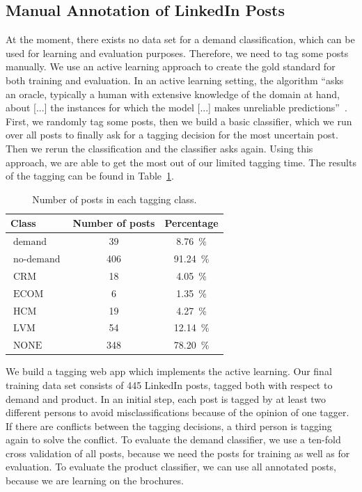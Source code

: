 \subsection{Manual Annotation of LinkedIn Posts}

At the moment, there exists no data set for a demand classification, which can be used for learning and evaluation purposes.
Therefore, we need to tag some posts manually.
We use an active learning approach to create the gold standard for both training and evaluation.
In an active learning setting, the algorithm ``asks an oracle, typically a human with extensive knowledge of the domain at hand, about [...] the instances for which the model [...] makes unreliable predictions''~\cite{olsson2009literature}.
First, we randomly tag some posts, then we build a basic classifier, which we run over all posts to finally ask for a tagging decision for the most uncertain post.
Then we rerun the classification and the classifier asks again.
Using this approach, we are able to get the most out of our limited tagging time.
The results of the tagging can be found in Table~\ref{table:data_overview}.

\begin{table}[h]
	\centering
	\begin{tabular}{lcc}
		\hline
		\textbf{Class} & \textbf{Number of posts} & \textbf{Percentage} \\
		\hline
		\hline
		$\operatorname{demand}$ & 39 & 8.76~\% \\
		\hline
		$\operatorname{no-demand}$ & 406 & 91.24~\% \\
		\hline
		\hline
		$\operatorname{CRM}$ & 18 & 4.05~\% \\
		\hline
		$\operatorname{ECOM}$ & 6 & 1.35~\% \\
		\hline
		$\operatorname{HCM}$ & 19 & 4.27~\% \\
		\hline
		$\operatorname{LVM}$ & 54 & 12.14~\% \\
		\hline
		$\operatorname{NONE}$ & 348 & 78.20~\% \\
		\hline
	\end{tabular}
	\caption{Number of posts in each tagging class.}
	\label{table:data_overview}
\end{table}

We build a tagging web app which implements the active learning.
Our final training data set consists of 445 LinkedIn posts, tagged both with respect to demand and product.
In an initial step, each post is tagged by at least two different persons to avoid misclassifications because of the opinion of one tagger.
If there are conflicts between the tagging decisions, a third person is tagging again to solve the conflict.
To evaluate the demand classifier, we use a ten-fold cross validation of all posts, because we need the posts for training as well as for evaluation.
To evaluate the product classifier, we can use all annotated posts, because we are learning on the brochures.

